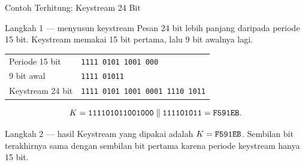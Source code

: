 \documentclass[aspectratio=169,11pt]{beamer}
\begin{document}
\begin{frame}{Contoh Terhitung: Keystream 24 Bit}
    \footnotesize
    \begin{block}{Langkah 1 --- menyusun keystream}
        Pesan 24 bit lebih panjang daripada periode 15 bit. Keystream
        memakai 15 bit pertama, lalu 9 bit awalnya lagi.
    \end{block}
    \vspace{0.1cm}
    \begin{center}
        \scriptsize
        \begin{tabular}{@{}l@{\quad}l@{}}
            Periode 15 bit & \texttt{1111 0101 1001 000} \\
            9 bit awal     & \texttt{1111 01011} \\
            Keystream 24 bit & \texttt{1111 0101 1001 0001 1110 1011} \\
        \end{tabular}
    \end{center}
    \vspace{0.1cm}
    \[
        K=\texttt{111101011001000}\;\Vert\;\texttt{111101011}
         =\texttt{F591EB}.
    \]
    \begin{exampleblock}{Langkah 2 --- hasil}
        Keystream yang dipakai adalah $K=\texttt{F591EB}$. Sembilan bit
        terakhirnya sama dengan sembilan bit pertama karena periode
        keystream hanya 15 bit.
    \end{exampleblock}
\end{frame}
\end{document}
